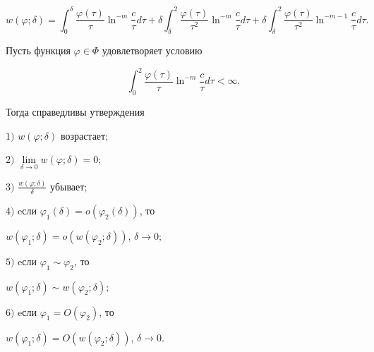 $$


w(\varphi;\delta)=\int^\delta_0\frac{\varphi(\tau)}{\tau}


\ln^{-m}\frac{c}{\tau}d\tau+\delta\int^2_\delta


\frac{\varphi(\tau)}{\tau^2}\ln^{-m}\frac{c}{\tau}


d\tau+\delta\int^2_\delta\frac{\varphi(\tau)}{\tau^2}


\ln^{-m-1}\frac{c}{\tau}d\tau.


$$





\begin{lem}


Пусть функция $\varphi\in\Phi$ удовлетворяет условию


$$


\int^2_0\frac{\varphi(\tau)}{\tau}


\ln^{-m}\frac{c}{\tau}d\tau<\infty.


$$





Тогда справедливы утверждения





$1)$ $w(\varphi;\delta)$ возрастает$;$ 





$2)$ $\lim\limits_{\delta\to0}w(\varphi;\delta)=0;$





$3)$ $\frac{w(\varphi;\delta)}{\delta}$ убывает$;$ 





$4)$ eсли $\varphi_1(\delta)=o(\varphi_2(\delta))$, то 


$w(\varphi_1;\delta)=o(w(\varphi_2;\delta))$, $\delta\to0;$





$5)$ eсли $\varphi_1\sim\varphi_2$, то 


$w(\varphi_1;\delta)\sim w(\varphi_2;\delta);$





$6)$ eсли $\varphi_1=O(\varphi_2)$, то 


$w(\varphi_1;\delta)=O(w(\varphi_2;\delta))$, $\delta\to0$.


\end{lem}





